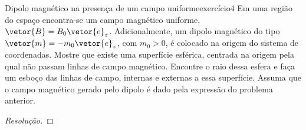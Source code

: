 \begin{exercício}{Dipolo magnético na presença de um campo uniforme}{exercício4}
    Em uma região do espaço encontra-se um campo magnético uniforme, \(\vetor{B} = B_0 \vetor{e}_z\). Adicionalmente, um dipolo magnético do tipo \(\vetor{m} = -m_0 \vetor{e}_z\), com \(m_0 > 0\), é colocado na origem do sistema de coordenadas. Mostre que existe uma superfície esférica, centrada na origem pela qual não passam linhas de campo magnético. Encontre o raio dessa esfera e faça um esboço das linhas de campo, internas e externas a essa superfície. Assuma que o campo magnético gerado pelo dipolo é dado pela expressão do problema anterior.
\end{exercício}
\begin{proof}[Resolução]

\end{proof}

